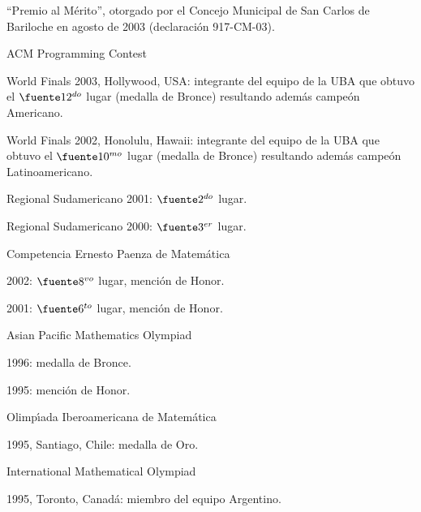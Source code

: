 
\item ``Premio al M\'erito'', otorgado por el Concejo Municipal de
San Carlos de Ba\-ri\-lo\-che en agosto de 2003 (declaraci\'on
917-CM-03).

\item { ACM Programming Contest}

\begin{compactitem}

\item World Finals 2003, Hollywood, USA: integrante del equipo de
la UBA que obtuvo el $\fuente 12^{do}$ lugar (medalla de Bronce)
resultando adem\'as cam\-pe\'on Americano.

\item World Finals 2002, Honolulu, Hawaii: integrante del equipo
de la UBA que obtuvo el $\fuente 10^{mo}$ lugar (medalla de
Bronce) resultando adem\'as cam\-pe\'on Latinoamericano.

\item Regional Sudamericano 2001: $\fuente 2^{do}$ lugar.

\item Regional Sudamericano 2000: $\fuente 3^{er}$ lugar.

\end{compactitem}

\item { Competencia Ernesto Paenza de Matem\'atica}
\begin{compactitem}
\item 2002: $\fuente 8^{vo}$ lugar, menci\'on de Honor. \item
2001: $\fuente 6^{to}$ lugar, menci\'on de Honor.
\end{compactitem}

\item { Asian Pacific Mathematics Olympiad}
\begin{compactitem}
\item 1996: medalla de Bronce. \item 1995: menci\'on de Honor.
\end{compactitem}

\item { Olimp\'{\i}ada Iberoamericana de Matem\'atica}
\begin{compactitem}
\item 1995, Santiago, Chile: medalla de Oro.
\end{compactitem}

\item { International Mathematical Olympiad}
\begin{compactitem}
\item 1995, Toronto, Canad\'a: miembro del equipo Argentino.
\end{compactitem}

